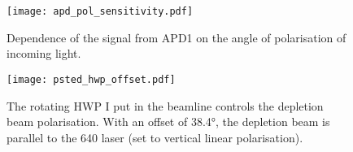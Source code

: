 \begin{figure}[ht]
	\centering
	\texttt{[image: apd\_pol\_sensitivity.pdf]}
	\caption{Dependence of the signal from APD1 on the angle of polarisation of incoming light.}
	\label{fig:apd pol sensitivity}
\end{figure}


\begin{figure}[ht]
	\centering
	\texttt{[image: psted\_hwp\_offset.pdf]}
	\caption{
		The rotating HWP I put in the beamline controls the depletion beam polarisation. With an offset of 38.4°, the depletion beam is parallel to the 640 laser (set to vertical linear polarisation).
	}
	\label{fig:psted hwp offset}
\end{figure}